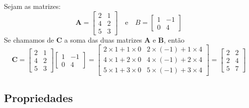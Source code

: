 \begin{ex}
	Sejam as matrizes:\\
	\begin{equation*}
	\textbf{A}=\begin{bmatrix}
	2   & 1\\
	4   & 2\\
	5   &  3
	\end{bmatrix}\quad \text{e}\quad B=\begin{bmatrix}
	1  & -1 \\
	0  &  4
	\end{bmatrix}  
	\end{equation*}
	Se chamamos de $\textbf{C}$ a soma das duas matrizes $\textbf{A}$ e $\textbf{B}$, então
	\begin{equation*}
	\textbf{C}=\begin{bmatrix}
	2   & 1\\
	4   & 2\\
	5   & 3
	\end{bmatrix} \begin{bmatrix}
	1  & -1 \\
	0  & 4 
	\end{bmatrix}= \begin{bmatrix}
	2\times 1 + 1 \times 0  & 2 \times (-1) + 1 \times 4 \\
	4 \times 1 + 2 \times 0 & 4\times (-1) + 2\times 4 \\
	5\times 1 +3\times 0    & 5\times (-1) + 3\times 4
	\end{bmatrix}=\begin{bmatrix}
	2  & 2 \\
	2  & 4 \\
	5  & 7
	\end{bmatrix} 
	\end{equation*} 
	
\end{ex}
\subsection*{Propriedades}
 

